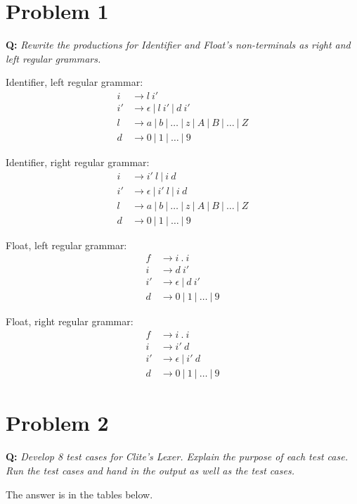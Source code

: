 \documentclass{article}
\begin{document}
\section*{Problem 1}
\textbf{Q:} \textit{Rewrite the productions for Identifier and Float's non-terminals as right and left regular grammars.}

Identifier, left regular grammar:
\begin{align*}
i &\rightarrow l\ i' \\
i' &\rightarrow \epsilon\ |\ l\ i'\ |\ d\ i' \\
l &\rightarrow a\ |\ b\ |\ \dots\ |\ z\ |\ A\ |\ B\ |\ \dots\ |\ Z \\
d &\rightarrow 0\ |\ 1\ |\ \dots\ |\ 9
\end{align*}

Identifier, right regular grammar:
\begin{align*}
i &\rightarrow i'\ l\ |\ i\ d \\
i' &\rightarrow \epsilon\ |\ i'\ l\ |\ i\ d \\
l &\rightarrow a\ |\ b\ |\ \dots\ |\ z\ |\ A\ |\ B\ |\ \dots\ |\ Z \\
d &\rightarrow 0\ |\ 1\ |\ \dots\ |\ 9
\end{align*}

Float, left regular grammar:
\begin{align*}
f &\rightarrow i\ .\ i \\
i &\rightarrow d\ i' \\
i' &\rightarrow \epsilon\ |\ d\ i' \\
d &\rightarrow 0\ |\ 1\ |\ \dots\ |\ 9
\end{align*}

Float, right regular grammar:
\begin{align*}
f &\rightarrow i\ .\ i \\
i &\rightarrow i'\ d \\
i' &\rightarrow \epsilon\ |\ i'\ d \\
d &\rightarrow 0\ |\ 1\ |\ \dots\ |\ 9
\end{align*}

\section*{Problem 2}
\textbf{Q:} \textit{Develop 8 test cases for Clite's Lexer. Explain the purpose of each test case. Run the test cases and hand in the output as well as the test cases.}

The answer is in the tables below.
\end{document}
